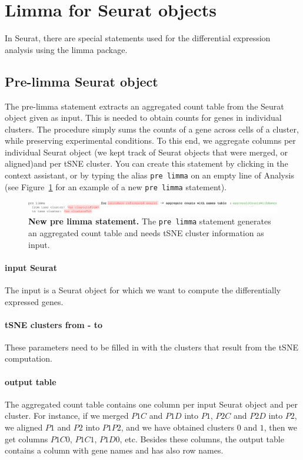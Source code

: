 \section{Limma for Seurat objects}\label{sec:LimmaSeurat}
In Seurat, there are special statements used for the differential expression analysis
using the limma package.

\subsection{Pre-limma Seurat object}
The pre-limma statement extracts an aggregated count table from the Seurat object given as input. This is needed to obtain counts for genes in individual clusters. The procedure simply sums the counts of a gene across cells of a cluster, while preserving experimental conditions. To this end, we aggregate columns per individual Seurat object (we kept track of Seurat objects that were merged, or aligned)and per tSNE cluster. You can create this statement by clicking  in the context assistant, or by typing the alias \texttt{pre limma} on an empty line of Analysis (see Figure~\ref{fig:PreLimmaSeurat} for an example of a new \texttt{pre limma} statement).

\begin{figure}[h!tbp]
  \centering
    \includegraphics[width=\figWidthWide]{figures/PreLimmaSeurat.pdf}
    \caption[New pre limma statement.]{\textbf{New pre limma statement.} The \texttt{pre
    limma} statement generates an aggregated count table and needs tSNE cluster information
    as input.}
\label{fig:PreLimmaSeurat}
\end{figure}

\paragraph{input Seurat} The input is a Seurat object for which we want to compute the
differentially expressed genes.

\paragraph{tSNE clusters from - to} These parameters need to be filled in with the clusters
that result from the tSNE computation.

\paragraph{output table} The aggregated count table contains one column per input Seurat
object and per cluster. For instance, if we merged $\mathit{P1C}$ and
$\mathit{P1D}$ into $\mathit{P1}$, $\mathit{P2C}$ and $\mathit{P2D}$ into $\mathit{P2}$, we aligned
$\mathit{P1}$ and $\mathit{P2}$ into $\mathit{P1P2}$, and we have obtained clusters
$\mathit{0}$ and $\mathit{1}$, then we get columns $\mathit{P1C0}$, $\mathit{P1C1}$, $\mathit{P1D0}$, etc.
Besides these columns, the output table contains a column with gene names and has also row names.

